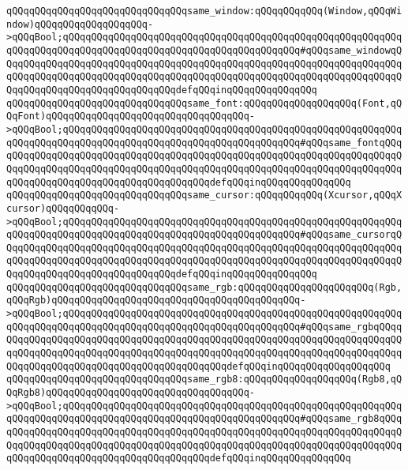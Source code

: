 \verb|qQQqqQQqqQQqqQQqqQQqqQQqqQQqqQQqsame_window:qQQqqQQqqQQq(Window,qQQqWindow)qQQqqQQqqQQqqQQqqQQq->qQQqBool;qQQqqQQqqQQqqQQqqQQqqQQqqQQqqQQqqQQqqQQqqQQqqQQqqQQqqQQqqQQqqQQqqQQqqQQqqQQqqQQqqQQqqQQqqQQqqQQqqQQqqQQqqQQqqQQq#qQQqsame_windowqQQqqQQqqQQqqQQqqQQqqQQqqQQqqQQqqQQqqQQqqQQqqQQqqQQqqQQqqQQqqQQqqQQqqQQqqQQqqQQqqQQqqQQqqQQqqQQqqQQqqQQqqQQqqQQqqQQqqQQqqQQqqQQqqQQqqQQqqQQqqQQqqQQqqQQqqQQqqQQqqQQqqQQqqQQqdefqQQqinqQQqqQQqqQQqqQQq|\newline
\verb|qQQqqQQqqQQqqQQqqQQqqQQqqQQqqQQqsame_font:qQQqqQQqqQQqqQQqqQQq(Font,qQQqFont)qQQqqQQqqQQqqQQqqQQqqQQqqQQqqQQqqQQq->qQQqBool;qQQqqQQqqQQqqQQqqQQqqQQqqQQqqQQqqQQqqQQqqQQqqQQqqQQqqQQqqQQqqQQqqQQqqQQqqQQqqQQqqQQqqQQqqQQqqQQqqQQqqQQqqQQqqQQq#qQQqsame_fontqQQqqQQqqQQqqQQqqQQqqQQqqQQqqQQqqQQqqQQqqQQqqQQqqQQqqQQqqQQqqQQqqQQqqQQqqQQqqQQqqQQqqQQqqQQqqQQqqQQqqQQqqQQqqQQqqQQqqQQqqQQqqQQqqQQqqQQqqQQqqQQqqQQqqQQqqQQqqQQqqQQqqQQqqQQqqQQqqQQqdefqQQqinqQQqqQQqqQQqqQQq|\newline
\verb|qQQqqQQqqQQqqQQqqQQqqQQqqQQqqQQqsame_cursor:qQQqqQQqqQQq(Xcursor,qQQqXcursor)qQQqqQQqqQQq->qQQqBool;qQQqqQQqqQQqqQQqqQQqqQQqqQQqqQQqqQQqqQQqqQQqqQQqqQQqqQQqqQQqqQQqqQQqqQQqqQQqqQQqqQQqqQQqqQQqqQQqqQQqqQQqqQQqqQQq#qQQqsame_cursorqQQqqQQqqQQqqQQqqQQqqQQqqQQqqQQqqQQqqQQqqQQqqQQqqQQqqQQqqQQqqQQqqQQqqQQqqQQqqQQqqQQqqQQqqQQqqQQqqQQqqQQqqQQqqQQqqQQqqQQqqQQqqQQqqQQqqQQqqQQqqQQqqQQqqQQqqQQqqQQqqQQqqQQqqQQqdefqQQqinqQQqqQQqqQQqqQQq|\newline
\verb|qQQqqQQqqQQqqQQqqQQqqQQqqQQqqQQqsame_rgb:qQQqqQQqqQQqqQQqqQQqqQQq(Rgb,qQQqRgb)qQQqqQQqqQQqqQQqqQQqqQQqqQQqqQQqqQQqqQQqqQQq->qQQqBool;qQQqqQQqqQQqqQQqqQQqqQQqqQQqqQQqqQQqqQQqqQQqqQQqqQQqqQQqqQQqqQQqqQQqqQQqqQQqqQQqqQQqqQQqqQQqqQQqqQQqqQQqqQQqqQQq#qQQqsame_rgbqQQqqQQqqQQqqQQqqQQqqQQqqQQqqQQqqQQqqQQqqQQqqQQqqQQqqQQqqQQqqQQqqQQqqQQqqQQqqQQqqQQqqQQqqQQqqQQqqQQqqQQqqQQqqQQqqQQqqQQqqQQqqQQqqQQqqQQqqQQqqQQqqQQqqQQqqQQqqQQqqQQqqQQqqQQqqQQqqQQqqQQqdefqQQqinqQQqqQQqqQQqqQQq|\verb|qQQq|\newline
\verb|qQQqqQQqqQQqqQQqqQQqqQQqqQQqqQQqsame_rgb8:qQQqqQQqqQQqqQQqqQQq(Rgb8,qQQqRgb8)qQQqqQQqqQQqqQQqqQQqqQQqqQQqqQQqqQQq->qQQqBool;qQQqqQQqqQQqqQQqqQQqqQQqqQQqqQQqqQQqqQQqqQQqqQQqqQQqqQQqqQQqqQQqqQQqqQQqqQQqqQQqqQQqqQQqqQQqqQQqqQQqqQQqqQQqqQQq#qQQqsame_rgb8qQQqqQQqqQQqqQQqqQQqqQQqqQQqqQQqqQQqqQQqqQQqqQQqqQQqqQQqqQQqqQQqqQQqqQQqqQQqqQQqqQQqqQQqqQQqqQQqqQQqqQQqqQQqqQQqqQQqqQQqqQQqqQQqqQQqqQQqqQQqqQQqqQQqqQQqqQQqqQQqqQQqqQQqqQQqqQQqqQQqdefqQQqinqQQqqQQqqQQqqQQq|\newline
